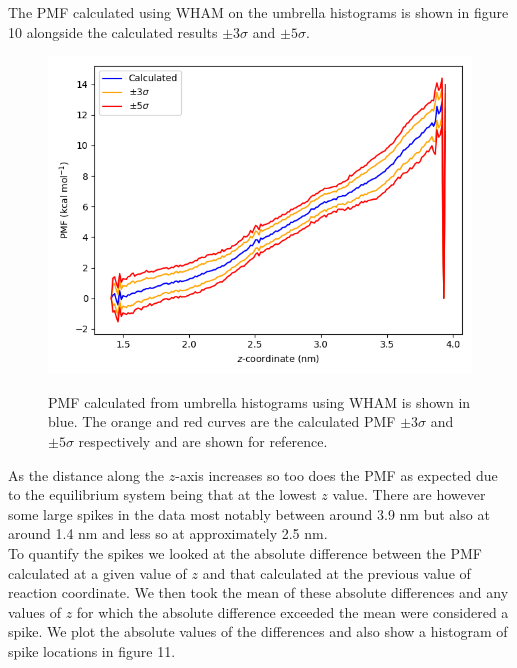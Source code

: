 \documentclass[12pt, onecolumn]{revtex4}    %
\begin{document}
The PMF calculated using WHAM on the umbrella histograms is shown in figure 10 alongside the calculated results $\pm 3 \sigma$ and $\pm 5 \sigma$.\\ 

\begin{figure}[h!]
\includegraphics[scale=0.5]{helPMF}
\label{fig: helPMF}
\caption{PMF calculated from umbrella histograms using WHAM is shown in blue.  The orange and red curves are the calculated PMF $\pm 3 \sigma$ and $\pm 5 \sigma$ respectively and are shown for reference.}
\end{figure}

 As the distance along the $z$-axis increases so too does the PMF as expected due to the equilibrium system being that at the lowest $z$ value.  There are however some large spikes in the data most notably between around 3.9 nm but also  at around 1.4 nm and less so at approximately 2.5 nm.\\
 
To quantify the spikes we looked at the absolute difference between the PMF calculated at a given value of $z$ and that calculated at the previous value of reaction coordinate.  We then took the mean of these absolute differences and any values of $z$ for which the absolute difference exceeded the mean were considered a spike.  We plot the absolute values of the differences and also show a histogram of spike locations in figure 11.\\
\end{document}

